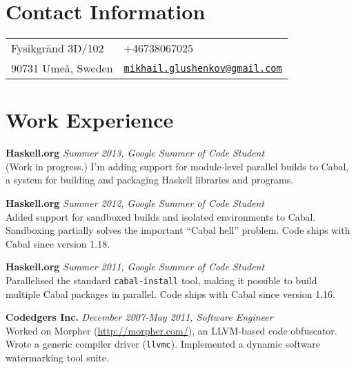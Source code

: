 \documentclass[margin,line]{res}
\begin{document}

\begin{resume}
\section{\sc Contact Information}
\vspace{.05in}
\begin{tabular}{@{}p{2in}p{4in}}
Fysikgränd 3D/102&
+46738067025\\
90731 Umeå, Sweden&
\href{mailto:mikhail.glushenkov@gmail.com}
{\texttt{mikhail.glushenkov@gmail.com}}\\
\end{tabular}

\section{\sc Work Experience}

{\bf Haskell.org} \hfill {\it Summer 2013, Google Summer of Code Student}\\
(Work in progress.) I'm adding support for module-level parallel builds to
Cabal, a system for building and packaging Haskell libraries and programs.


{\bf Haskell.org} \hfill {\it Summer 2012, Google Summer of Code Student}\\
Added support for sandboxed builds and isolated environments to
Cabal. Sandboxing partially solves the important ``Cabal hell'' problem. Code
ships with Cabal since version 1.18.

{\bf Haskell.org} \hfill {\it Summer 2011, Google Summer of Code Student}\\
Parallelised the standard \texttt{cabal-install} tool, making it possible to
build multiple Cabal packages in parallel. Code ships with Cabal since version
1.16.

{\bf Codedgers Inc.} \hfill {\it December 2007-May 2011, Software Engineer}\\
Worked on Morpher (\url{http://morpher.com/}), an LLVM-based code
obfuscator. Wrote a generic compiler driver (\texttt{llvmc}). Implemented a
dynamic software watermarking tool suite.



\end{resume}
\end{document}
